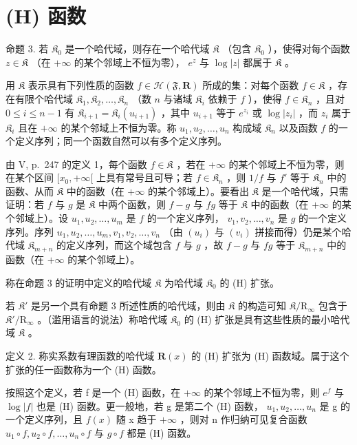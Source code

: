 \section{(H) 函数}

命题 3. 若 \(\mathfrak{K}_0\) 是一个哈代域，则存在一个哈代域 \(\mathfrak{K}\) （包含 \(\mathfrak{K}_0\) ），使得对每个函数 \(z \in \mathfrak{K}\) （在 \(+\infty\) 的某个邻域上不恒为零）， \(e^z\) 与 \(\log |z|\) 都属于 \(\mathfrak{K}\) 。

用 \(\mathfrak{K}\) 表示具有下列性质的函数 \(f\in \mathcal{H}(\mathfrak{F},\mathbf{R})\) 所成的集：对每个函数 \(f\in \mathfrak{K}\) ，存在有限个哈代域 \(\mathfrak{K}_1,\mathfrak{K}_2,\ldots ,\mathfrak{K}_n\) （数 \(n\) 与诸域 \(\mathfrak{K}_i\) 依赖于 \(f\) ），使得 \(f\in \mathfrak{K}_n\) ，且对 \(0\leqslant i\leqslant n - 1\) 有 \(\mathfrak{K}_{i + 1} = \mathfrak{K}_i(u_{i + 1})\) ，其中 \(u_{i + 1}\) 等于 \(e^{z_i}\) 或 \(\log |z_i|\) ，而 \(z_{i}\) 属于 \(\mathfrak{K}_i\) 且在 \(+\infty\) 的某个邻域上不恒为零。称 \(u_{1},u_{2},\ldots ,u_{n}\) 构成域 \(\mathfrak{K}_n\) 以及函数 \(f\) 的一个定义序列；同一个函数自然可以有多个定义序列。

由 V, p.~247 的定义 1，每个函数 \(f \in \mathfrak{K}\) ，若在 \(+\infty\) 的某个邻域上不恒为零，则在某个区间 \([x_0, +\infty[\) 上具有常号且可导；若 \(f \in \mathfrak{K}_n\) ，则 \(1/f\) 与 \(f'\) 等于 \(\mathfrak{K}_n\) 中的函数、从而 \(\mathfrak{K}\) 中的函数（在 \(+\infty\) 的某个邻域上）。要看出 \(\mathfrak{K}\) 是一个哈代域，只需证明：若 \(f\) 与 \(g\) 是 \(\mathfrak{K}\) 中两个函数，则 \(f - g\) 与 \(fg\) 等于 \(\mathfrak{K}\) 中的函数（在 \(+\infty\) 的某个邻域上）。设 \(u_1, u_2, \ldots, u_m\) 是 \(f\) 的一个定义序列， \(v_1, v_2, \ldots, v_n\) 是 \(g\) 的一个定义序列。序列 \(u_1, u_2, \ldots, u_m, v_1, v_2, \ldots, v_n\) （由 \((u_i)\) 与 \((v_i)\) 拼接而得）仍是某个哈代域 \(\mathfrak{K}_{m+n}\) 的定义序列，而这个域包含 \(f\) 与 \(g\) ，故 \(f - g\) 与 \(fg\) 等于 \(\mathfrak{K}_{m+n}\) 中的函数（在 \(+\infty\) 的某个邻域上）。

称在命题 3 的证明中定义的哈代域 \(\mathfrak{K}\) 为哈代域 \(\mathfrak{K}_0\) 的 (H) 扩张。

若 \(\mathfrak{K}'\) 是另一个具有命题 3 所述性质的哈代域，则由 \(\mathfrak{K}\) 的构造可知 \(\mathfrak{K} / \mathrm{R}_{\infty}\) 包含于 \(\mathfrak{K}' / \mathrm{R}_{\infty}\) 。（滥用语言的说法）称哈代域 \(\mathfrak{K}_0\) 的 (H) 扩张是具有这些性质的最小哈代域 \(\mathfrak{K}\) 。

定义 2. 称实系数有理函数的哈代域 \(\mathbf{R}(x)\) 的 (H) 扩张为 (H) 函数域。属于这个扩张的任一函数称为一个 (H) 函数。

按照这个定义，若 f 是一个 (H) 函数，在 \(+\infty\) 的某个邻域上不恒为零，则 \(e^{f}\) 与 \(\log |f|\) 也是 (H) 函数。更一般地，若 g 是第二个 (H) 函数， \(u_{1}, u_{2}, \ldots, u_{n}\) 是 g 的一个定义序列，且 \(f(x)\) 随 x 趋于 \(+\infty\) ，则对 n 作归纳可见复合函数 \(u_{1} \circ f, u_{2} \circ f, \ldots, u_{n} \circ f\) 与 \(g \circ f\) 都是 (H) 函数。

